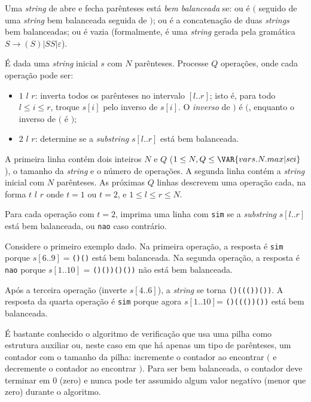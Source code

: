 Uma \textit{string} de abre e fecha parênteses está \textit{bem balanceada} se:
ou é $($ seguido de uma \textit{string} bem balanceada seguida de $)$;
ou é a concatenação de duas \textit{strings} bem balanceadas;
ou é vazia (formalmente, é uma \textit{string} gerada pela gramática $S \rightarrow (S) | SS | \varepsilon$).

É dada uma \textit{string} inicial $s$ com $N$ parênteses. Processe $Q$ operações, onde cada operação pode ser:
\begin{itemize}
    \item $1$ $l$ $r$: inverta todos os parênteses no intervalo
    $[l..r]$; isto é,
    para todo $l \leq i \leq r$, troque $s[i]$ pelo inverso de $s[i]$. O
    \textit{inverso} de $)$ é $($, enquanto o inverso de $($ é $)$;
    \item $2$ $l$ $r$: determine se a \textit{substring} $s[l..r]$ está bem balanceada.
\end{itemize}


A primeira linha contém dois inteiros $N$ e $Q$
($1 \leq N, Q \leq \VAR{vars.N.max | sci}$), o tamanho da \textit{string} e o
número de operações.
A segunda linha contém a \textit{string} inicial com $N$ parênteses.
As próximas $Q$ linhas descrevem uma operação cada, na forma
$t$ $l$ $r$ onde $t=1$ ou $t=2$, e $1 \leq l \leq r \leq N$.


Para cada operação com $t=2$, imprima uma linha com \texttt{sim} se a \textit{substring}
$s[l..r]$ está bem balanceada, ou \texttt{nao} caso contrário.

Considere o primeiro exemplo dado.
Na primeira operação, a resposta é \texttt{sim} porque
$s[6..9] = $\texttt{()()} está bem balanceada. Na segunda operação, a resposta é
\texttt{nao} porque $s[1..10]$ = \texttt{()())()())} não está bem balanceada.

Após a terceira operação (inverte $s[4..6]$), a \textit{string} se torna
\texttt{()((())())}. A resposta da quarta operação é \texttt{sim} porque agora
$s[1..10]$= \texttt{()((())())} está bem balanceada.


É bastante conhecido o algoritmo de verificação que usa uma pilha como estrutura auxiliar ou,
neste caso em que há apenas um tipo de parênteses, um contador com o tamanho da
pilha: incremente o contador ao encontrar $($ e decremente o contador ao
encontrar $)$. Para ser bem balanceada, o contador deve terminar em 0 (zero) e
nunca pode ter assumido algum valor negativo (menor que zero) durante o
algoritmo.

